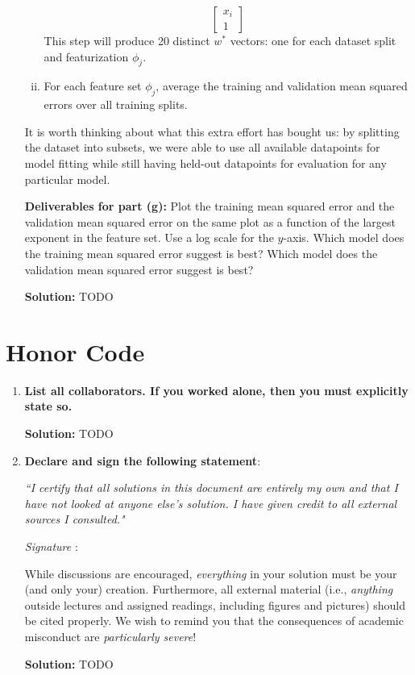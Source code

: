 \documentclass{article}
\newcommand{\Question}[1]{\Large \section{ #1 } \normalsize}
\newenvironment{solution}{\color{blue} \smallskip \textbf{Solution:}}{}
\begin{document}
\begin{enumerate}[(a)]
\begin{enumerate}[(i)]
\[\begin{bmatrix}
                x_i \\
                1
            \end{bmatrix}
        \]
        This step will produce 20 distinct $w^*$ vectors: one for each dataset split and featurization $\phi_j$.        
        \item 
        For each feature set $\phi_j$, average the training and validation mean squared errors over all training splits.
    \end{enumerate}
    It is worth thinking about what this extra effort has bought us: by splitting the dataset into subsets, we were able to use all available datapoints for model fitting while still having held-out datapoints for evaluation for any particular model.

    \textbf{Deliverables for part (g):} Plot the training mean squared error and the validation mean squared error on the same plot as a function of the largest exponent in the feature set. 
    Use a log scale for the $y$-axis.
    Which model does the training mean squared error suggest is best? 
    Which model does the validation mean squared error suggest is best?

    \begin{solution}
        TODO
    \end{solution}
    
\end{enumerate}

\newpage
\Question{Honor Code}

\begin{enumerate}
    \item 
    \textbf{List all collaborators. If you worked alone, then you must explicitly state so.}

    \begin{solution}
        TODO
    \end{solution}

    \item
    \textbf{Declare and sign the following statement}: 
    
    \textit{``I certify that all solutions in this document are entirely my own and that I have not looked at anyone else's solution. I have given credit to all external sources I consulted."}
    
    \textit{Signature} : \hrulefill
    
    While discussions are encouraged, \emph{everything} in your solution must be your (and only your) creation. 
    Furthermore, all external material  (i.e., \emph{anything} outside lectures and assigned
    readings, including figures and pictures) should be cited properly.
    We wish to remind you that the consequences of academic misconduct are \emph{particularly severe}!

    \begin{solution}
        TODO
    \end{solution}

\end{enumerate}
\end{document}
